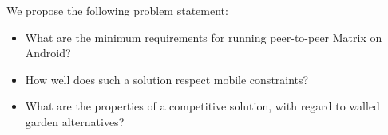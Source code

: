 We propose the following problem statement:\\
\begin{itemize}
	\item What are the minimum requirements for running peer-to-peer Matrix on Android?
	\item How well does such a solution respect mobile constraints?
	\item What are the properties of a competitive solution, with regard to walled garden alternatives?
\end{itemize}